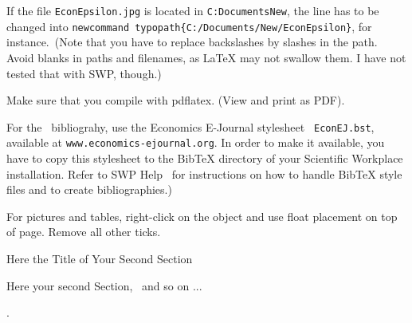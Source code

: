 \documentclass[12pt,a4paper,english,fleqn]{article}
\makeatletter
\renewcommand\section{\@startsection{section}{1}{\z@}
{-5ex \@plus -1ex \@minus -.2ex}{2.3ex \@plus.2ex}
 {\normalfont\large\bf}}
\makeatother
\begin{document}
If the file \texttt{EconEpsilon.jpg} is located in \texttt{C:\TEXTsymbol{%
\backslash}Documents\TEXTsymbol{\backslash}New}, the line has to be changed
into\newline
\texttt{\TEXTsymbol{\backslash}newcommand\TEXTsymbol{\backslash}%
typopath\{C:/Documents/New/EconEpsilon\}},\newline
for instance.\ (Note that you have to replace backslashes by slashes in the
path. Avoid blanks in paths and filenames, as LaTeX may not swallow them. I
have not tested that with SWP, though.)

Make sure that you compile with pdflatex. (View and print as PDF).

For the \ bibliograhy, use the Economics E-Journal stylesheet \texttt{%
EconEJ.bst}, available at \texttt{www.economics-ejournal.org}. In order to
make it available, you have to copy this stylesheet to the BibTeX directory
of your Scientific Workplace installation. Refer to SWP Help \ for
instructions on how to handle BibTeX style files and to create
bibliographies.)

For pictures and tables, right-click on the object and use float placement
on top of page. Remove all other ticks.


\section{Here the Title of Your Second Section}

Here your second Section, \ and so on ...

\bigskip .


\end{document}
